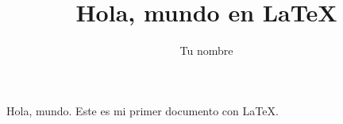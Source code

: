 \documentclass{article}
\title{Hola, mundo en LaTeX}
\author{Tu nombre}
\begin{document}
  \maketitle
  Hola, mundo. Este es mi primer documento con \LaTeX.
\end{document}
